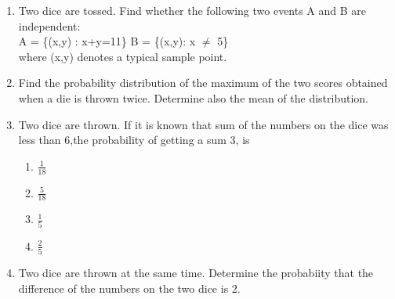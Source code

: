 \begin{enumerate}[label=\thesection.\arabic*,ref=\thesection.\theenumi]
\item Two dice are tossed. Find whether the following two events A and B are independent:\\
A = \{(x,y) : x+y=11\} B = \{(x,y): x $\neq$ 5\}\\
where (x,y) denotes a typical sample point.

\item Find the probability distribution of the maximum of the two scores obtained when a die is thrown twice. Determine also the mean of the distribution.\\

\item Two dice are thrown. If it is known that sum of the numbers on the dice was less than 6,the probability of getting a sum 3, is
\begin{enumerate}[label=\Alph*)]
\item $\frac{1}{18}$ \\
\item $\frac{5}{18}$ \\
\item $\frac{1}{5}$ \\
\item $\frac{2}{5}$ 
\end{enumerate}

\item Two dice are thrown at the same time. Determine the probabiity that the difference
of the numbers on the two dice is 2. 

\end{enumerate}
